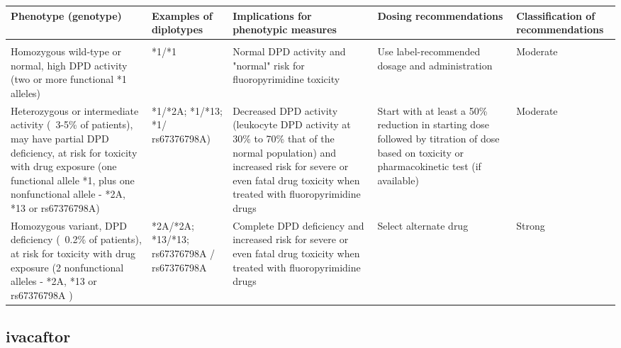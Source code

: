 \documentclass{report}
\begin{document}
      \begin{tabularx}{\textwidth}{ XXXXX }
      \textbf{ Phenotype (genotype) }&\textbf{ Examples of diplotypes }&\textbf{ Implications for phenotypic measures }&\textbf{ Dosing recommendations }&\textbf{ Classification of recommendations } \\ \hline \\  Homozygous wild-type or normal, high DPD activity (two or more functional *1 alleles) & *1/*1 & Normal DPD activity and "normal" risk for fluoropyrimidine toxicity & Use label-recommended dosage and administration & Moderate  \\  Heterozygous or intermediate activity (~3-5\% of patients), may have partial DPD deficiency, at risk for toxicity with drug exposure (one functional allele *1, plus one nonfunctional allele - *2A, *13 or rs67376798A) & *1/*2A; *1/*13; *1/ rs67376798A) & Decreased DPD activity (leukocyte DPD activity at 30\% to 70\% that of the normal population) and increased risk for severe or even fatal drug toxicity when treated with fluoropyrimidine drugs & Start with at least a 50\% reduction in starting dose followed by titration of dose based on toxicity  or pharmacokinetic test (if available) & Moderate  \\  Homozygous variant, DPD deficiency (~0.2\% of patients), at risk for toxicity with drug exposure (2 nonfunctional alleles - *2A, *13 or rs67376798A ) & *2A/*2A; *13/*13; rs67376798A / rs67376798A & Complete DPD deficiency and increased risk for severe or even fatal drug toxicity when treated with fluoropyrimidine drugs & Select alternate drug & Strong  \\ 
      \end{tabularx}
      
      \newpage
      \normalsize

























\subsection{ ivacaftor }
\end{document}
